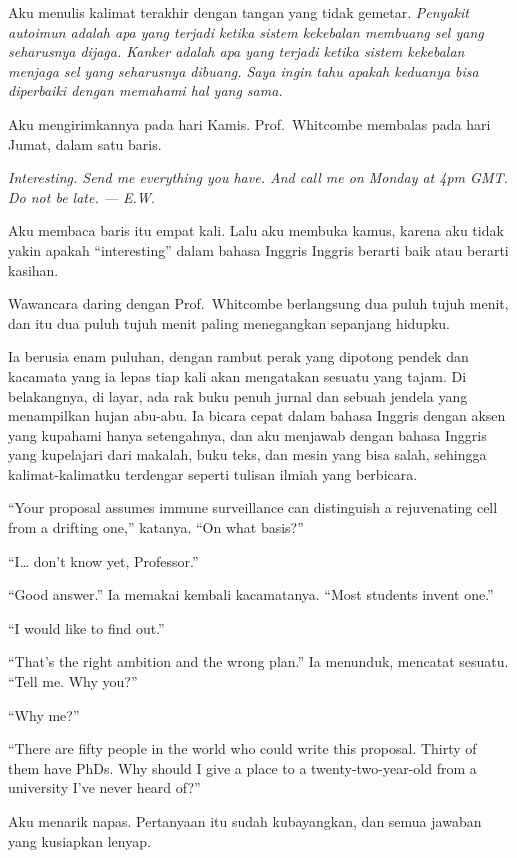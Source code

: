 \documentclass[11pt,twoside,openany]{book}
\makeatletter
\newcommand{\scenebreak}{\par\vspace{0.9em}{\centering\textsc{*\hspace{0.7em}*\hspace{0.7em}*}\par}\vspace{0.9em}\@afterindentfalse\@afterheading}
\makeatother
\begin{document}
Aku menulis kalimat terakhir dengan tangan yang tidak gemetar. \emph{Penyakit autoimun adalah apa yang terjadi ketika sistem kekebalan membuang sel yang seharusnya dijaga. Kanker adalah apa yang terjadi ketika sistem kekebalan menjaga sel yang seharusnya dibuang. Saya ingin tahu apakah keduanya bisa diperbaiki dengan memahami hal yang sama.}

Aku mengirimkannya pada hari Kamis. Prof.~Whitcombe membalas pada hari Jumat, dalam satu baris.

\emph{Interesting. Send me everything you have. And call me on Monday at 4pm GMT. Do not be late. --- E.W.}

Aku membaca baris itu empat kali. Lalu aku membuka kamus, karena aku tidak yakin apakah ``interesting'' dalam bahasa Inggris Inggris berarti baik atau berarti kasihan.

\scenebreak
Wawancara daring dengan Prof.~Whitcombe berlangsung dua puluh tujuh menit, dan itu dua puluh tujuh menit paling menegangkan sepanjang hidupku.

Ia berusia enam puluhan, dengan rambut perak yang dipotong pendek dan kacamata yang ia lepas tiap kali akan mengatakan sesuatu yang tajam. Di belakangnya, di layar, ada rak buku penuh jurnal dan sebuah jendela yang menampilkan hujan abu-abu. Ia bicara cepat dalam bahasa Inggris dengan aksen yang kupahami hanya setengahnya, dan aku menjawab dengan bahasa Inggris yang kupelajari dari makalah, buku teks, dan mesin yang bisa salah, sehingga kalimat-kalimatku terdengar seperti tulisan ilmiah yang berbicara.

``Your proposal assumes immune surveillance can distinguish a rejuvenating cell from a drifting one,'' katanya. ``On what basis?''

``I\ldots{} don't know yet, Professor.''

``Good answer.'' Ia memakai kembali kacamatanya. ``Most students invent one.''

``I would like to find out.''

``That's the right ambition and the wrong plan.'' Ia menunduk, mencatat sesuatu. ``Tell me. Why you?''

``Why me?''

``There are fifty people in the world who could write this proposal. Thirty of them have PhDs. Why should I give a place to a twenty-two-year-old from a university I've never heard of?''

Aku menarik napas. Pertanyaan itu sudah kubayangkan, dan semua jawaban yang kusiapkan lenyap.
\end{document}
